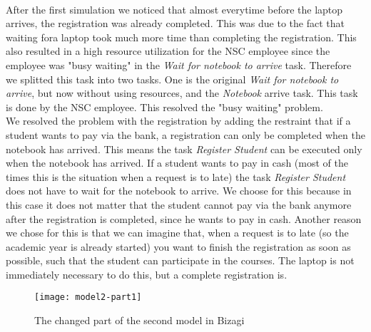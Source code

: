 \\
After the first simulation we noticed that almost everytime before the laptop arrives, the registration was already completed. This was due to the fact that waiting fora laptop took much more time than completing the registration. This also resulted in a  high resource utilization for the NSC employee since the employee was "busy waiting" in the \emph{Wait for notebook to arrive} task. Therefore we splitted this task into two tasks. One is the original \emph{Wait for notebook to arrive}, but now without using resources, and the \emph{Notebook} arrive task. This task is done by the NSC employee. This resolved the "busy waiting" problem.\\
We resolved the problem with the registration by adding the restraint that if a student wants to pay via the bank, a registration can only be completed when the notebook has arrived. This means the task \emph{Register Student} can be executed only when the notebook has arrived. If a student wants to pay in cash (most of the times this is the situation when a request is to late) the task \emph{Register Student} does not have to wait for the notebook to arrive. We choose for this because in this case it does not matter that the student cannot pay via the bank anymore after the registration is completed, since he wants to pay in cash. Another reason we chose for this is that we can imagine that, when a request is to late (so the academic year is already started) you want to finish the registration as soon as possible, such that the student can participate in the courses. The laptop is not immediately necessary to do this, but a complete registration is.

\begin{figure}[!ht]
\begin{center}
	\texttt{[image: model2-part1]}
	\caption{The changed part of the second model in Bizagi}
	\label{fig:model2-part1}
\end{center}
\end{figure}

\newpage